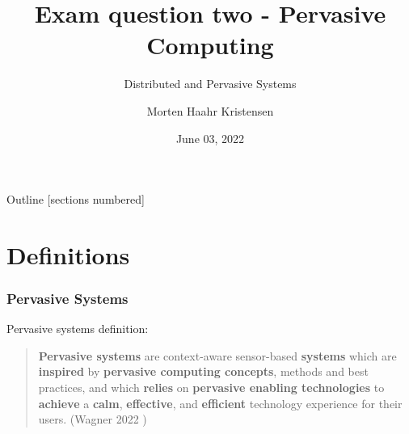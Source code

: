 \documentclass[10pt]{beamer}
\title[Pervasive Computing]{Exam question two - Pervasive Computing}
\subtitle{Distributed and Pervasive Systems}
\date{June 03, 2022}
\author[M.H. Kristensen]{Morten Haahr Kristensen}
\institute{Department of Electrical and Computer Engineering - Aarhus University}
\begin{document}
\maketitle

\begin{frame}{Outline}
  [sections numbered]
  \tableofcontents[hideallsubsections]
\end{frame}

\section{Definitions}

\begin{frame}
  \frametitle{Pervasive Systems}
  Pervasive systems definition: \\
  \vspace*{-1.0em}
  \begin{quote}
    \textbf{Pervasive systems} are context-aware sensor-based \textbf{systems} which are \textbf{inspired} by \textbf{pervasive computing concepts}, methods and best practices, and which \textbf{relies} on \textbf{pervasive enabling technologies} to \textbf{achieve} a \textbf{calm}, \textbf{effective}, and \textbf{efficient} technology experience for their users. (Wagner 2022 \cite{wagnerPervasiveComputing2022})
  \end{quote}
\end{frame}
\end{document}
